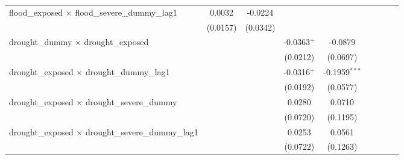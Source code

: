 \begin{tabular}{lcccccccc}
   flood\_exposed $\times$ flood\_severe\_dummy\_lag1                & 0.0032                & -0.0224               &                       &                       &                       &                       &                       &   \\   
                                                                     & (0.0157)              & (0.0342)              &                       &                       &                       &                       &                       &   \\   
   drought\_dummy $\times$ drought\_exposed                          &                       &                       & -0.0363$^{+}$         & -0.0879               &                       &                       &                       &   \\   
                                                                     &                       &                       & (0.0212)              & (0.0697)              &                       &                       &                       &   \\   
   drought\_exposed $\times$ drought\_dummy\_lag1                    &                       &                       & -0.0316$^{+}$         & -0.1959$^{***}$       &                       &                       &                       &   \\   
                                                                     &                       &                       & (0.0192)              & (0.0577)              &                       &                       &                       &   \\   
   drought\_exposed $\times$ drought\_severe\_dummy                  &                       &                       & 0.0280                & 0.0710                &                       &                       &                       &   \\   
                                                                     &                       &                       & (0.0720)              & (0.1195)              &                       &                       &                       &   \\   
   drought\_exposed $\times$ drought\_severe\_dummy\_lag1            &                       &                       & 0.0253                & 0.0561                &                       &                       &                       &   \\   
                                                                     &                       &                       & (0.0722)              & (0.1263)              &                       &                       &                       &   \\   

\end{tabular}
